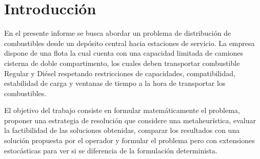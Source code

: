 \section{Introducción}

En el presente informe se busca abordar un problema de distribución de combustibles desde un depósito central hacia estaciones de servicio. La empresa dispone de una flota la cual cuenta con una capacidad limitada de camiones cisterna de doble compartimento, los cuales deben transportar combustible Regular y Diésel respetando restricciones de capacidades, compatibilidad, estabilidad de carga y ventanas de tiempo a la hora de transportar los combustibles.

El objetivo del trabajo consiste en formular matemáticamente el problema, proponer una estrategia de resolución que considere una metaheurística, evaluar la factibilidad de las soluciones obtenidas, comparar los resultados con una solución propuesta por el operador y formular el problema pero con extensiones estocásticas para ver si se diferencia de la formulación determinista.